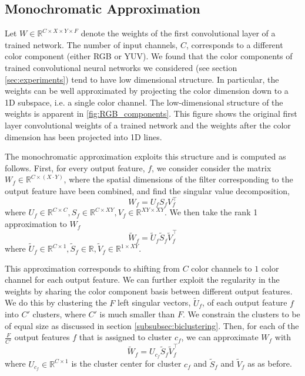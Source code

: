 \subsection{Monochromatic Approximation}\label{subsec:monochromatic}
Let $W \in \mathbb{R}^{C \times X \times Y \times F}$ denote the
weights of the first convolutional layer of a trained network.  The
number of input channels, $C$, corresponds to a different color
component (either RGB or YUV).  We found that the color components of trained convolutional neural networks we considered (see
section \ref{sec:experiments}) tend to have low dimensional structure. In
particular, the weights can be well approximated by projecting the
color dimension down to a 1D subspace, i.e. a single color
channel. The low-dimensional structure of the weights is apparent in
\ref{fig:RGB_components}. This figure shows the original first layer convolutional weights
of a trained network and the weights after the color dimension has
been projected into 1D lines.


The monochromatic approximation exploits this structure and is computed as follows.
First, for every output feature, $f$, we consider consider the matrix $W_f \in \mathbb{R}^{C \times (X\cdot Y) }$, 
where the spatial dimensions of the filter corresponding to the output feature have been combined, and find the singular value decomposition, 
\begin{equation*}
	W_f = U_f S_f V_f^{\top}
\end{equation*}
where $U_f \in \mathbb{R}^{C \times C}, S_f \in \mathbb{R}^{C \times XY}, V_f \in \mathbb{R}^{XY \times XY}$. 
We then take the rank 1 approximation to $W_f$ 
\begin{equation}
\label{blo1}
	\tilde{W}_f = \tilde{U}_f \tilde{S}_f \tilde{V}_f^{\top}
\end{equation}
where $\tilde{U}_f \in \mathbb{R}^{C \times 1}, \tilde{S}_f \in \mathbb{R}, \tilde{V}_f \in \mathbb{R}^{1 \times XY}$.

This approximation corresponds to shifting from $C$ color channels to $1$ color channel for each output feature. 
We can further exploit the regularity in the weights by sharing the color component basis between different output features. 
We do this by clustering the $F$ left singular vectors, $\tilde{U}_f$, of each output feature $f$ into $C'$ clusters, 
where $C'$ is much smaller than $F$. We constrain the clusters to be of equal size as discussed in section \ref{subsubsec:biclustering}.  
Then, for each of the $\frac{F}{C'}$ output features $f$ that is assigned to cluster $c_f$, we can approximate $W_f$ with
\begin{equation}
\label{blo2}
	\tilde{W}_f = U_{c_f} \tilde{S}_f \tilde{V}_f^{\top}
\end{equation}
where $U_{c_f} \in \mathbb{R}^{C \times 1}$ is the cluster center for cluster $c_f$ and $\tilde{S}_f$ and $\tilde{V}_f$ as as before. 


